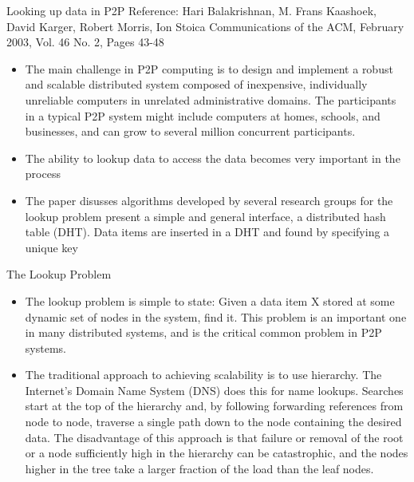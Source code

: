 \documentclass[9pt]{beamer}
\begin{document}
\begin{frame}{Looking up data in P2P}
        \small Reference: Hari Balakrishnan, M. Frans Kaashoek, David Karger, Robert Morris, Ion Stoica
Communications of the ACM, February 2003, Vol. 46 No. 2, Pages 43-48
    \break
    \begin{itemize}
        \item The main challenge in P2P computing is to design and implement a robust and scalable distributed system composed of inexpensive, individually unreliable computers in unrelated administrative domains. The participants in a typical P2P system might include computers at homes, schools, and businesses, and can grow to several million concurrent participants.
        \item The ability to lookup data to access the data becomes very important in the process
        \item The paper disusses algorithms developed by several research groups for the lookup problem present a simple and general interface, a distributed hash table (DHT). Data items  are  inserted in  a  DHT  and found  by  specifying  a  unique  key
    \end{itemize}
\end{frame}
\begin{frame}{The Lookup Problem}
    \begin{itemize}
        \item The lookup problem is simple to state: Given a data item  X stored  at  some  dynamic  set  of  nodes  in  the system, find it. This problem is an important one in many  distributed  systems,  and  is  the  critical  common problem in P2P systems.
        \item The  traditional  approach  to  achieving  scalability
is  to  use  hierarchy.  The  Internet’s  Domain  Name System (DNS) does this for name lookups. Searches start  at  the  top  of  the  hierarchy  and,  by  following
forwarding references from node to node, traverse a single path down to the node containing the desired data. The disadvantage of this approach is that failure or removal of the root or a node sufficiently high in the hierarchy can be catastrophic, and the nodes higher  in  the  tree  take  a  larger  fraction  of  the  load than the leaf nodes.
    \end{itemize}
\end{frame}
\end{document}
